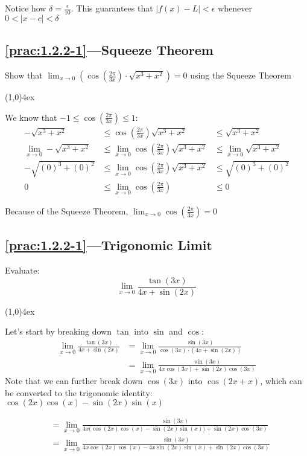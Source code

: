 \documentclass{MathNotes}
\newcommand{\br}{
\begin{center}
\line(1,0){4ex}
\end{center}}
\begin{document}
Notice how $\delta=\frac{\epsilon}{10}$. This guarantees that
$\lvert f(x)-L \rvert < \epsilon$ whenever $0<\lvert x-c \rvert<\delta$

\subsection*{\ref{prac:1.2.2-1}---Squeeze Theorem}\label{ans:1.2.2-1}
Show that
$\displaystyle\lim_{x\to 0}(\cos(\frac{2\pi}{3x})\cdot\sqrt{x^3+x^2})=0$
using the Squeeze Theorem
\br
We know that $\displaystyle-1\leq\cos(\frac{2\pi}{3x})\leq 1$:
\begin{align*}
    -\sqrt{x^3+x^2}&\leq\cos(\frac{2\pi}{3x})\sqrt{x^3+x^2}&\leq
    \sqrt{x^3+x^2}
    \\
    \lim_{x\to 0}-\sqrt{x^3+x^2}&\leq\lim_{x\to 0}\cos(\frac{2\pi}{3x})
    \sqrt{x^3+x^2}&\leq\lim_{x\to 0}\sqrt{x^3+x^2}
    \\
    -\sqrt{(0)^3+(0)^2}&\leq\lim_{x\to 0}\cos(\frac{2\pi}{3x})
    \sqrt{x^3+x^2}&\leq\sqrt{(0)^3+(0)^2}
    \\
    0&\leq\lim_{x\to 0}\cos(\frac{2\pi}{3x})&\leq0 
\end{align*}

Because of the Squeeze Theorem, $\displaystyle\lim_{x\to 0}\cos(\frac{2\pi}{3x})=0$

\subsection*{\ref{prac:1.2.2-1}---Trigonomic Limit}\label{ans:1.2.2-2}
Evaluate:
$$\lim_{x\to 0}\frac{\tan(3x)}{4x+\sin(2x)}$$
\br

Let's start by breaking down $\tan$ into $\sin$ and $\cos$:
\begin{align*}
    \lim_{x\to 0}\frac{\tan(3x)}{4x+\sin(2x)}
    &=\lim_{x\to 0}\frac{\sin(3x)}{\cos(3x)\cdot(4x+\sin(2x))}\\
    &=\lim_{x\to 0}\frac{\sin(3x)}{4x\cos(3x)+\sin(2x)\cos(3x)}
\end{align*}
Note that we can further break down $\cos(3x)$ into $\cos(2x+x)$, which can 
be converted to the trigonomic identity:$\cos(2x)\cos(x)-\sin(2x)\sin(x)$

\begin{align*}
    &=\lim_{x\to 0}\frac{\sin(3x)}{4x\big(\cos(2x)\cos(x)-\sin(2x)\sin(x)\big)+\sin(2x)\cos(3x)}\\
    &=\lim_{x\to 0}\frac{\sin(3x)}{4x\cos(2x)\cos(x)-4x\sin(2x)\sin(x)+\sin(2x)\cos(3x)}
\end{align*}
\end{document}
